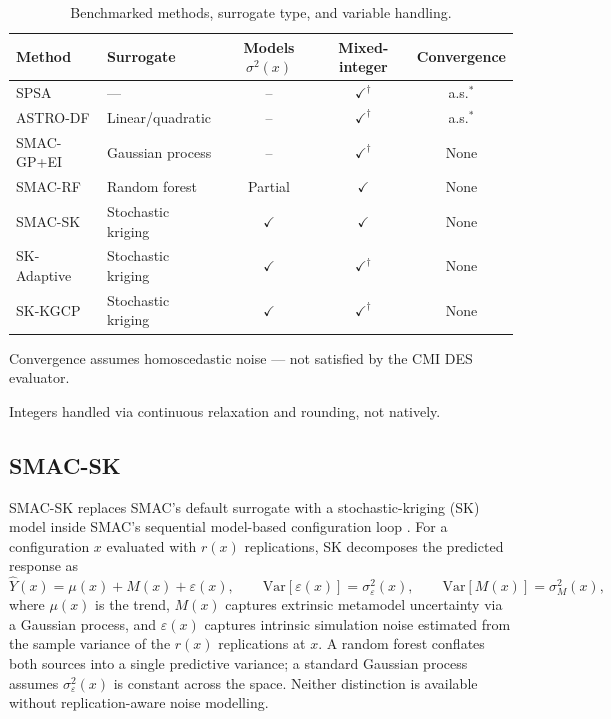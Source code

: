 \documentclass[11pt]{elsarticle}
\begin{document}
\begin{table}[H]
\centering
\caption{Benchmarked methods, surrogate type, and variable handling.}
\label{tab:methods}
\begin{threeparttable}
\small
\begin{tabular}{@{}llccc@{}}
\toprule
Method & Surrogate & Models $\sigma^2(x)$ & Mixed-integer & Convergence \\
\midrule
SPSA         & ---               & --           & $\checkmark^\dagger$ & a.s.$^{*}$ \\
ASTRO-DF     & Linear/quadratic  & --           & $\checkmark^\dagger$ & a.s.$^{*}$ \\
SMAC-GP+EI   & Gaussian process  & --           & $\checkmark^\dagger$ & None \\
SMAC-RF      & Random forest     & Partial      & $\checkmark$         & None \\
SMAC-SK      & Stochastic kriging& $\checkmark$ & $\checkmark$         & None \\
SK-Adaptive  & Stochastic kriging& $\checkmark$ & $\checkmark^\dagger$ & None \\
SK-KGCP      & Stochastic kriging& $\checkmark$ & $\checkmark^\dagger$ & None \\
\bottomrule
\end{tabular}
\begin{tablenotes}
\footnotesize
\item[$*$] Convergence assumes homoscedastic noise --- not satisfied by the CMI DES evaluator.
\item[$\dagger$] Integers handled via continuous relaxation and rounding, not natively.
\end{tablenotes}
\end{threeparttable}
\end{table}

\subsection{SMAC-SK}
\label{sec:smacsk}

SMAC-SK replaces SMAC's default surrogate with a stochastic-kriging (SK) model \citep{Ankenman2010} inside SMAC's sequential model-based configuration loop \citep{Hutter2011,Lindauer2022}. For a configuration $x$ evaluated with $r(x)$ replications, SK decomposes the predicted response as
\begin{equation}
\hat{Y}(x) = \mu(x) + M(x) + \varepsilon(x),
\qquad
\mathrm{Var}[\varepsilon(x)] = \sigma^2_\varepsilon(x),
\qquad
\mathrm{Var}[M(x)] = \sigma^2_M(x),
\label{eq:sk}
\end{equation}
where $\mu(x)$ is the trend, $M(x)$ captures extrinsic metamodel uncertainty via a Gaussian process, and $\varepsilon(x)$ captures intrinsic simulation noise estimated from the sample variance of the $r(x)$ replications at $x$. A random forest conflates both sources into a single predictive variance; a standard Gaussian process assumes $\sigma^2_\varepsilon(x)$ is constant across the space. Neither distinction is available without replication-aware noise modelling.
\end{document}
